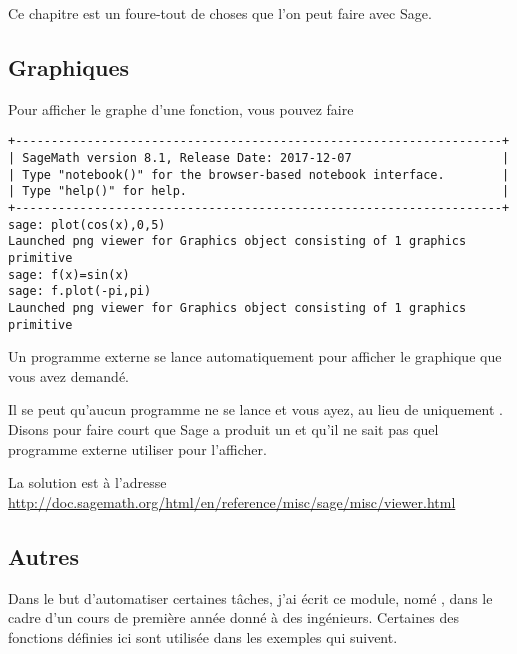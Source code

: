 
Ce chapitre est un foure-tout de choses que l'on peut faire avec Sage.

\subsection{Graphiques}

Pour afficher le graphe d'une fonction, vous pouvez faire
\begin{verbatim}
+--------------------------------------------------------------------+
| SageMath version 8.1, Release Date: 2017-12-07                     | 
| Type "notebook()" for the browser-based notebook interface.        | 
| Type "help()" for help.                                            |
+--------------------------------------------------------------------+
sage: plot(cos(x),0,5)
Launched png viewer for Graphics object consisting of 1 graphics primitive
sage: f(x)=sin(x)
sage: f.plot(-pi,pi)
Launched png viewer for Graphics object consisting of 1 graphics primitive
\end{verbatim}
Un programme externe se lance automatiquement pour afficher le graphique que vous avez demandé.

Il se peut qu'aucun programme ne se lance et vous ayez, au lieu de  uniquement . Disons pour faire court que Sage a produit un  et qu'il ne sait pas quel programme externe utiliser pour l'afficher.

La solution est à l'adresse \url{http://doc.sagemath.org/html/en/reference/misc/sage/misc/viewer.html}
\subsection{Autres}

Dans le but d'automatiser certaines tâches, j'ai écrit ce module, nomé , dans le cadre d'un cours de première année donné à des ingénieurs. Certaines des fonctions définies ici sont utilisée dans les exemples qui suivent.

